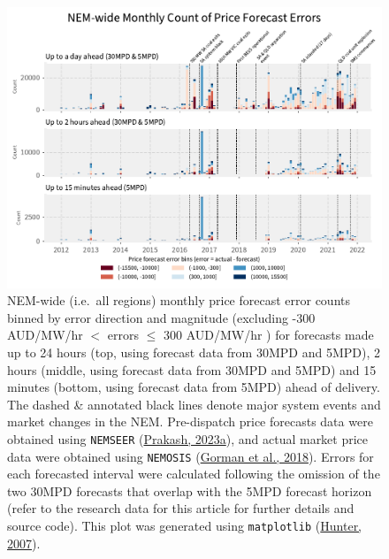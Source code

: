\documentclass[12pt,a4paper,]{report}
\begin{document}
\begin{figure}
\hypertarget{fig:nem_historical_price_forecast_errors}{%
\centering
\includegraphics{source/figures/price_errors_nemwide_2012_2021.pdf}
\caption{NEM-wide (i.e.~all regions) monthly price forecast error counts
binned by error direction and magnitude (excluding -300 AUD/MW/hr \(<\)
errors \(\leq\) 300 AUD/MW/hr ) for forecasts made up to 24 hours (top,
using forecast data from 30MPD and 5MPD), 2 hours (middle, using
forecast data from 30MPD and 5MPD) and 15 minutes (bottom, using
forecast data from 5MPD) ahead of delivery. The dashed \& annotated
black lines denote major system events and market changes in the NEM.
Pre-dispatch price forecasts data were obtained using \texttt{NEMSEER}
(\protect\hyperlink{ref-prakashNEMSEER2023}{Prakash, 2023a}), and actual
market price data were obtained using \texttt{NEMOSIS}
(\protect\hyperlink{ref-gormanNEMOSISNEMOpen2018}{Gorman et al., 2018}).
Errors for each forecasted interval were calculated following the
omission of the two 30MPD forecasts that overlap with the 5MPD forecast
horizon (refer to the research data for this article for further details
and source code). This plot was generated using \texttt{matplotlib}
(\protect\hyperlink{ref-hunterMatplotlib2DGraphics2007}{Hunter,
2007}).}\label{fig:nem_historical_price_forecast_errors}
}
\end{figure}
\end{document}
